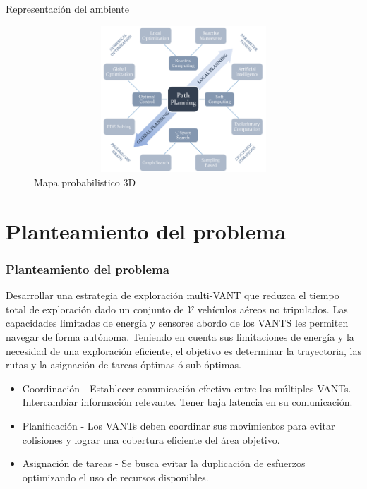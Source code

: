 \documentclass[
	11pt, %
	aspectratio=169, %
]{beamer}
\begin{document}
\begin{frame}{Representación del ambiente}

  \begin{figure}
    \centering
    \includegraphics[width=12cm, height=5.5cm]{panorama_planning}
    \caption[Caption for LOF]{Mapa probabilistico 3D\protect\footnotemark}
  \end{figure}
  
\end{frame}

\section{Planteamiento del problema}

\begin{frame}
  \frametitle{Planteamiento del problema}
  Desarrollar una estrategia de exploración multi-VANT que reduzca el tiempo total de exploración dado un conjunto de $\mathcal{V}$ vehículos aéreos no tripulados. Las capacidades limitadas de energía y sensores abordo de los VANTS les permiten navegar de forma autónoma. Teniendo en cuenta sus limitaciones de energía y la necesidad de una exploración eficiente, el objetivo es determinar la trayectoria, las rutas y la asignación de tareas óptimas ó sub-óptimas.
  \bigskip %
  \begin{itemize}
  \item<1-> Coordinación - Establecer comunicación efectiva entre los múltiples VANTs. Intercambiar información relevante. Tener baja latencia en su comunicación.
  \item<2-> Planificación - Los VANTs deben coordinar sus movimientos para evitar colisiones y lograr una cobertura eficiente del área objetivo.
  \item<3-> Asignación de tareas - Se busca evitar la duplicación de esfuerzos optimizando el uso de recursos disponibles.
  \end{itemize}
  
\end{frame}
\end{document}
